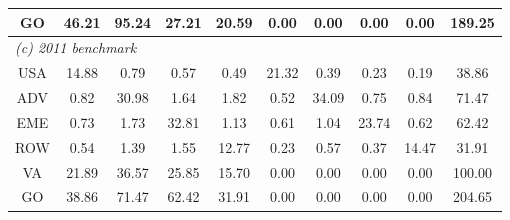 \begin{table}[p]
\begin{center}
\begin{tabular}{cccccccccc}
GO& 46.21& 95.24& 27.21& 20.59& 0.00& 0.00& 0.00& 0.00& 189.25\\
\midrule
\multicolumn{10}{l}{\textit{(c) 2011 benchmark}}\\
USA& 14.88& 0.79& 0.57& 0.49& 21.32& 0.39& 0.23& 0.19& 38.86 \\
ADV& 0.82& 30.98& 1.64& 1.82& 0.52& 34.09& 0.75& 0.84& 71.47 \\
EME& 0.73& 1.73& 32.81& 1.13& 0.61& 1.04& 23.74& 0.62& 62.42 \\
ROW& 0.54& 1.39& 1.55& 12.77& 0.23& 0.57& 0.37& 14.47& 31.91 \\
VA& 21.89& 36.57& 25.85& 15.70& 0.00& 0.00& 0.00& 0.00& 100.00\\
GO& 38.86& 71.47& 62.42& 31.91& 0.00& 0.00& 0.00& 0.00& 204.65\\
\bottomrule
\end{tabular}
\normalsize
\end{center}
\end{table}
